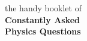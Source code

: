 \begin{titlepage}
\begin{center}

{\LARGE the handy booklet of }\\[0.4cm]
{ \Huge \bfseries Constantly Asked \\ Physics Questions \\[0.4cm] }

\end{center}
\end{titlepage}
